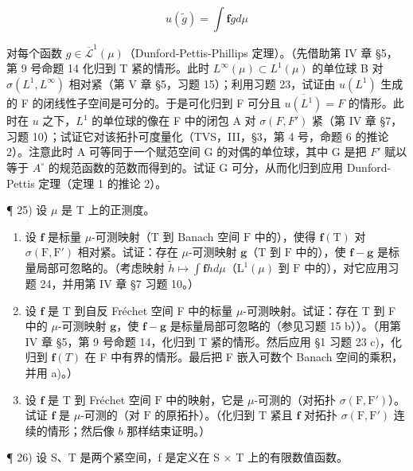 \[
u (\widetilde {g}) = \int \mathbf {f} g d \mu
\]

对每个函数 \(g \in \overline{\mathcal{L}}^1(\mu)\)（Dunford-Pettis-Phillips 定理）。（先借助第 IV 章 §5，第 9 号命题 14 化归到 T 紧的情形。此时 \(L^\infty(\mu) \subset L^1(\mu)\) 的单位球 B 对 \(\sigma(L^1, L^\infty)\) 相对紧（第 V 章 §5，习题 15）；利用习题 23，试证由 \(u(L^1)\) 生成的 F 的闭线性子空间是可分的。于是可化归到 F 可分且 \(\overline{u(L^1)} = F\) 的情形。此时在 \(u\) 之下，\(L^1\) 的单位球的像在 F 中的闭包 A 对 \(\sigma(F, F')\) 紧（第 IV 章 §7，习题 10）；试证它对该拓扑可度量化（TVS，III，§3，第 4 号，命题 6 的推论 2）。注意此时 A 可等同于一个赋范空间 G 的对偶的单位球，其中 G 是把 \(F'\) 赋以等于 \(A^\circ\) 的规范函数的范数而得到的。试证 G 可分，从而化归到应用 Dunford-Pettis 定理（定理 1 的推论 2）。

¶ 25) 设 \(\mu\) 是 T 上的正测度。

\begin{enumerate}
\def\labelenumi{\alph{enumi})}
\item
  设 \(\mathbf{f}\) 是标量 \(\mu\)-可测映射（\(\mathrm{T}\) 到 Banach 空间 \(\mathrm{F}\) 中的），使得 \(\mathbf{f}(\mathrm{T})\) 对 \(\sigma(\mathrm{F},\mathrm{F}')\) 相对紧。试证：存在 \(\mu\)-可测映射 \(\mathbf{g}\)（\(\mathrm{T}\) 到 \(\mathrm{F}\) 中的），使 \(\mathbf{f} - \mathbf{g}\) 是标量局部可忽略的。（考虑映射 \(\widetilde{h} \mapsto \int \mathbf{f}h d\mu\)（\(\mathrm{L}^1(\mu)\) 到 \(\mathrm{F}\) 中的），对它应用习题 24，并用第 IV 章 §7 习题 10。）
\item
  设 \(\mathbf{f}\) 是 T 到自反 Fréchet 空间 F 中的标量 \(\mu\)-可测映射。试证：存在 T 到 F 中的 \(\mu\)-可测映射 \(\mathbf{g}\)，使 \(\mathbf{f} - \mathbf{g}\) 是标量局部可忽略的（参见习题 15 b））。（用第 IV 章 §5，第 9 号命题 14，化归到 T 紧的情形。然后应用 §1 习题 23 c)，化归到 \(\mathbf{f}(T)\) 在 F 中有界的情形。最后把 F 嵌入可数个 Banach 空间的乘积，并用 a)。）
\item
  设 \(\mathbf{f}\) 是 \(\mathrm{T}\) 到 Fréchet 空间 \(\mathrm{F}\) 中的映射，它是 \(\mu\)-可测的（对拓扑 \(\sigma(\mathrm{F}, \mathrm{F}')\)）。试证 \(\mathbf{f}\) 是 \(\mu\)-可测的（对 \(\mathrm{F}\) 的原拓扑）。（化归到 \(\mathrm{T}\) 紧且 \(\mathbf{f}\) 对拓扑 \(\sigma(\mathrm{F}, \mathrm{F}')\) 连续的情形；然后像 \(b\) 那样结束证明。）
\end{enumerate}

¶ 26) 设 S、T 是两个紧空间，f 是定义在 S × T 上的有限数值函数。

